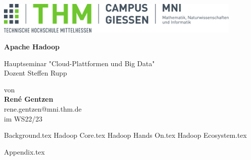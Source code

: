 \documentclass[%
	BCOR=8.25mm,         %
	DIV=12,              %
	parskip=half,		 %
	bibliography=totoc,	 %
	headsepline=on,      %
	]{scrbook}
\begin{document}
\frontmatter

\begin{titlepage}
	\begin{center}
	\includegraphics[width=0.9\textwidth]{mni-logo}
	
	\vspace{5cm}	

	\vspace{1cm}	

	\huge\textbf{\sffamily Apache Hadoop}

	\normalsize
	\vspace{1cm}	

	Hauptseminar "Cloud-Plattformen und Big Data" \\
	Dozent Steffen Rupp

	von \\[1cm]	

	\textbf{René Gentzen}\\ [.5cm] 
	rene.gentzen@mni.thm.de\\ [.5cm] 
	im WS22/23
	\end{center}
	\vfill
\end{titlepage}

\tableofcontents
\listoffigures

\mainmatter 
\pagestyle{headings}
{Background.tex}
{Hadoop Core.tex}
{Hadoop Hands On.tex}
{Hadoop Ecosystem.tex}



\backmatter 

\appendix
{Appendix.tex}
\printbibliography
\end{document}

